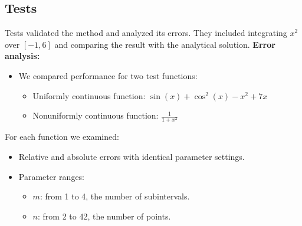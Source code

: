 \subsection{Tests}

Tests validated the method and analyzed its errors. They included integrating \( x^2 \) over \([-1, 6]\) and comparing the result with the analytical solution.
\textbf{Error analysis:}
\begin{itemize}
    \item We compared performance for two test functions:
    \begin{itemize}
        \item Uniformly continuous function: \( \sin(x) + \cos^2(x) - x^2 + 7x \)
        \item Nonuniformly continuous function: \( \frac{1}{1+x^2} \)
    \end{itemize}
\end{itemize}
For each function we examined:
\begin{itemize}
    \item Relative and absolute errors with identical parameter settings.
    \item Parameter ranges:
    \begin{itemize}
        \item \( m \): from 1 to 4, the number of subintervals.
        \item \( n \): from 2 to 42, the number of points.
    \end{itemize}
\end{itemize}

